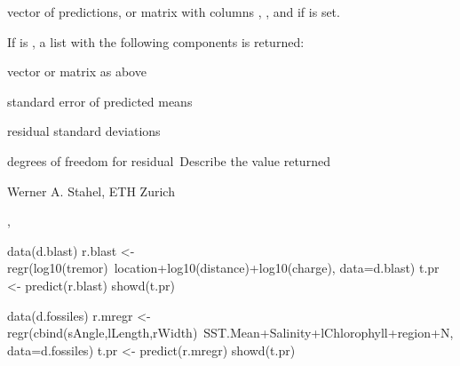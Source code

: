 \documentclass{article}
\begin{document}
\begin{Value}
vector of predictions, or matrix with columns , ,
and  if  is set.

If  is , a list with the
following components is returned:  

\begin{ldescription}
\item[\code{fit}] vector or matrix as above
\item[\code{se.fit}] standard error of predicted means
\item[\code{residual.scale}] residual standard deviations
\item[\code{df}] degrees of freedom for residual~Describe the value returned
\end{ldescription}
\end{Value}
\begin{Author}\relax
Werner A. Stahel, ETH Zurich
\end{Author}
\begin{SeeAlso}\relax
{}, 
\end{SeeAlso}
\begin{Examples}
\begin{ExampleCode}
data(d.blast)
r.blast <- regr(log10(tremor)~location+log10(distance)+log10(charge),
            data=d.blast)
t.pr <- predict(r.blast)
showd(t.pr)

data(d.fossiles)
r.mregr <-
  regr(cbind(sAngle,lLength,rWidth)~SST.Mean+Salinity+lChlorophyll+region+N,
                data=d.fossiles)
t.pr <- predict(r.mregr)
showd(t.pr)
\end{ExampleCode}
\end{Examples}
\end{document}
